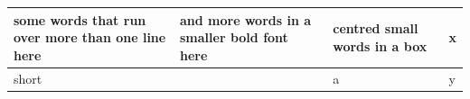\documentclass{article}
\begin{document}
\begin{tabular}{|>{\small}p{2cm}|>{\footnotesize\bfseries}m{25mm}|>{\centering\arraybackslash\small}b{2cm}|l|}
\hline
some words that run over more than one line here & and more words in a smaller bold font here & centred small words in a box & x \\
\hline
short & & a & y \\[3pt]
\hline
\end{tabular}
\end{document}

